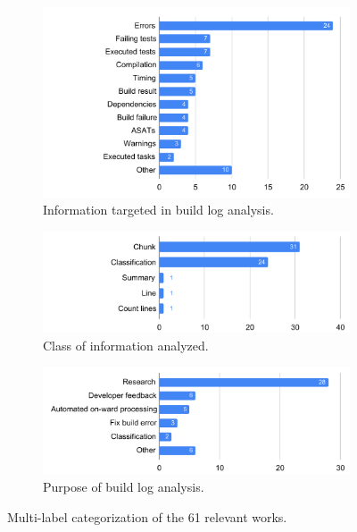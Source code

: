 \begin{figure}
\centering
\begin{subfigure}[t]{\columnwidth}
		\centering
		\includegraphics[width=\columnwidth,
		clip]{img/lit-sur/info_target.pdf}
		\caption{Information targeted in build log analysis.}
		\label{fig:litsur:info_target}

\end{subfigure}\hspace{\fill}
\begin{subfigure}[t]{\columnwidth}
		\centering
				\includegraphics[width=\columnwidth,
				clip]{img/lit-sur/kind.pdf}
		\caption{Class of information analyzed.}
		\label{fig:litsur:kind}

\end{subfigure}
\begin{subfigure}[t]{\columnwidth}
		\centering
				\includegraphics[width=\columnwidth,
				clip]{img/lit-sur/use.pdf}
		\caption{Purpose of build log analysis.}
		\label{fig:litsur:use}

\end{subfigure}

\caption{Multi-label categorization of the 61 relevant works.}
\label{fig:litsur_r}
\end{figure}

